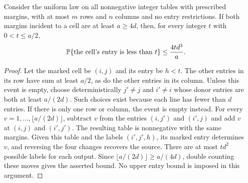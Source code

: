 \begin{lemma}\label{lem:small-entry}
Consider the uniform law on all nonnegative integer tables with prescribed
margins, with at most $m$ rows and $n$ columns and no entry restrictions.
If both margins incident to a cell are at least $a\ge4d$, then, for every
integer $t$ with $0<t\le a/2$,
\[
 \mathbb{P}\{\text{the cell's entry is less than }t\}\le\frac{4td^3}{a}.
\]
\end{lemma}
\begin{proof}
Let the marked cell be $(i,j)$ and its entry be $h<t$.
The other entries in its row have sum at least $a/2$, as do the other
entries in its column.  Unless this event is empty, choose deterministically
$j'\ne j$ and $i'\ne i$ whose donor entries are both at least $a/(2d)$.
Such choices exist because each line has fewer than $d$ entries.  If there
is only one row or column, the event is empty instead.
For every $v=1,\ldots,\lfloor a/(2d)\rfloor$, subtract $v$ from the
entries $(i,j')$ and $(i',j)$ and add $v$ at $(i,j)$ and $(i',j')$.
The resulting table is nonnegative with the same margins.  Given this
table and the labels $(i',j',h)$, its marked entry determines $v$, and
reversing the four changes recovers the source.  There are at most $td^2$
possible labels for each output.  Since
$\lfloor a/(2d)\rfloor\ge a/(4d)$, double counting these moves gives
the asserted bound.  No upper entry bound is imposed in this argument.
\end{proof}

